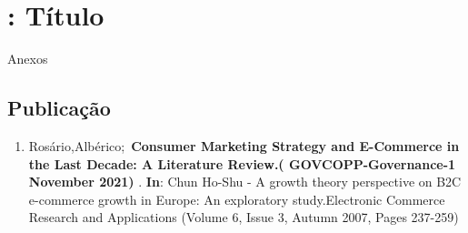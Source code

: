\section{: Título}
    Anexos
    \subsection*{Publicação}
        \begin{enumerate}
            \item Rosário,Albérico;~\textbf{Consumer Marketing Strategy and E-Commerce in the Last Decade: A Literature Review.(
GOVCOPP-Governance-1 November 2021) }. \textbf{In}: Chun Ho-Shu - A growth theory perspective on B2C e-commerce growth in Europe: An exploratory study.Electronic Commerce Research and Applications
(Volume 6, Issue 3, Autumn 2007, Pages 237-259)
        \end{enumerate}